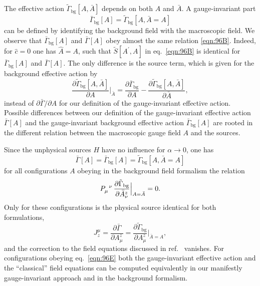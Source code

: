 \documentclass[twocolumn,aps,prd,amsmath,amssymb,preprintnumbers,longbibliography]{revtex4-1}
\numberwithin{equation}{section}
\begin{document}
The effective action $\tilde\Gamma_\text{bg}[A,\bar{A}]$ depends on both $A$ and $\bar{A}$. A gauge-invariant part
\begin{equation}\label{eqn:103B}
	\bar\Gamma_\text{bg}[A] = \tilde\Gamma_\text{bg}[A,\bar{A} = A]
\end{equation}
can be defined by identifying the background field with the macroscopic field. We observe that $\bar\Gamma_\text{bg}[A]$ and $\bar\Gamma[A]$ obey almost the same relation \eqref{eqn:96B}. Indeed, for $\hat{c} = 0$ one has $\hat{A} = A$, such that $\tilde{S}[A^\prime,A]$ in eq.~\eqref{eqn:96B} is identical for $\bar\Gamma_\text{bg}[A]$ and $\bar\Gamma[A]$. The only difference is the source term, which is given for the background effective action by
\begin{equation}\label{eqn:103C}
	\frac{\partial \tilde\Gamma_\text{bg}[A,\bar{A}]}{\partial A}\biggr|_{\bar{A}}
	= \frac{\partial \bar\Gamma_\text{bg}}{\partial A} - \frac{\partial \tilde\Gamma_\text{bg}[A,\bar{A}]}{\partial \bar{A}},
\end{equation}
instead of $\partial \bar\Gamma/\partial A$ for our definition of the gauge-invariant effective action. Possible differences between our definition of the gauge-invariant effective action $\bar\Gamma[A]$ and the gauge-invariant background effective action $\bar\Gamma_\text{bg}[A]$ are rooted in the different relation between the macroscopic gauge field $A$ and the sources.

Since the unphysical sources $H$ have no influence for $\alpha \to 0$, one has
\begin{equation}\label{eqn:96D}
	\bar{\Gamma}[A]
	= \bar\Gamma_\text{bg}[A]
	= \tilde\Gamma_\text{bg}[A,\bar{A} = A]
\end{equation}
for all configurations $A$ obeying in the background field formalism the relation
\begin{equation}\label{eqn:96F}
	\tensor{P}{_\mu^\nu} \, \frac{\partial \tilde\Gamma_\text{bg}}{\partial \bar{A}_\nu^z}\Bigr|_{A = \bar{A}}
	= 0.
\end{equation}
Only for these configurations is the physical source identical for both formulations,
\begin{equation}\label{eqn:96E}
	J_z^\mu
	= \frac{\partial \bar\Gamma}{\partial A_\mu^z}
	= \frac{\partial \tilde\Gamma_\text{bg}}{\partial A_\mu^z}\Bigr|_{\bar{A} = A},
\end{equation}
and the correction to the field equations discussed in ref.~\cite{RW} vanishes. For configurations obeying eq.~\eqref{eqn:96E} both the gauge-invariant effective action and the ``classical'' field equations can be computed equivalently in our manifestly gauge-invariant approach and in the background formalism.
\end{document}
